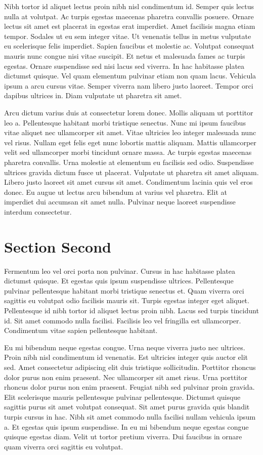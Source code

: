 Nibh tortor id aliquet lectus proin nibh nisl condimentum id. Semper 
quis lectus nulla at volutpat. Ac turpis egestas maecenas pharetra 
convallis posuere. Ornare lectus sit amet est placerat in egestas erat 
imperdiet. Amet facilisis magna etiam tempor. Sodales ut eu sem integer 
vitae. Ut venenatis tellus in metus vulputate eu scelerisque felis 
imperdiet. Sapien faucibus et molestie ac. Volutpat consequat mauris 
nunc congue nisi vitae suscipit. Et netus et malesuada fames ac turpis 
egestas. Ornare suspendisse sed nisi lacus sed viverra. In hac habitasse
 platea dictumst quisque. Vel quam elementum pulvinar etiam non quam 
lacus. Vehicula ipsum a arcu cursus vitae. Semper viverra nam libero 
justo laoreet. Tempor orci dapibus ultrices in. Diam vulputate ut 
pharetra sit amet.


Arcu dictum varius duis at consectetur lorem donec. Mollis aliquam ut
 porttitor leo a. Pellentesque habitant morbi tristique senectus. Nunc 
mi ipsum faucibus vitae aliquet nec ullamcorper sit amet. Vitae 
ultricies leo integer malesuada nunc vel risus. Nullam eget felis eget 
nunc lobortis mattis aliquam. Mattis ullamcorper velit sed ullamcorper 
morbi tincidunt ornare massa. Ac turpis egestas maecenas pharetra 
convallis. Urna molestie at elementum eu facilisis sed odio. Suspendisse
 ultrices gravida dictum fusce ut placerat. Vulputate ut pharetra sit 
amet aliquam. Libero justo laoreet sit amet cursus sit amet. Condimentum
 lacinia quis vel eros donec. Eu augue ut lectus arcu bibendum at varius
 vel pharetra. Elit at imperdiet dui accumsan sit amet nulla. Pulvinar 
neque laoreet suspendisse interdum consectetur.

\section{Section Second}
Fermentum leo vel orci porta non pulvinar. Cursus in hac habitasse 
platea dictumst quisque. Et egestas quis ipsum suspendisse ultrices. 
Pellentesque pulvinar pellentesque habitant morbi tristique senectus et.
 Quam viverra orci sagittis eu volutpat odio facilisis mauris sit. 
Turpis egestas integer eget aliquet. Pellentesque id nibh tortor id 
aliquet lectus proin nibh. Lacus sed turpis tincidunt id. Sit amet 
commodo nulla facilisi. Facilisis leo vel fringilla est ullamcorper. 
Condimentum vitae sapien pellentesque habitant.


Eu mi bibendum neque egestas congue. Urna neque viverra justo nec 
ultrices. Proin nibh nisl condimentum id venenatis. Est ultricies 
integer quis auctor elit sed. Amet consectetur adipiscing elit duis 
tristique sollicitudin. Porttitor rhoncus dolor purus non enim praesent.
 Nec ullamcorper sit amet risus. Urna porttitor rhoncus dolor purus non 
enim praesent. Feugiat nibh sed pulvinar proin gravida. Elit scelerisque
 mauris pellentesque pulvinar pellentesque. Dictumst quisque sagittis 
purus sit amet volutpat consequat. Sit amet purus gravida quis blandit 
turpis cursus in hac. Nibh sit amet commodo nulla facilisi nullam 
vehicula ipsum a. Et egestas quis ipsum suspendisse. In eu mi bibendum 
neque egestas congue quisque egestas diam. Velit ut tortor pretium 
viverra. Dui faucibus in ornare quam viverra orci sagittis eu volutpat.


